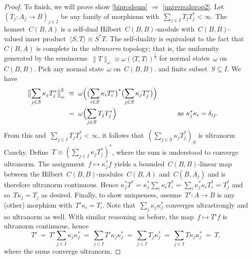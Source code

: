 \documentclass[reqno,T1]{amsproc}
\theoremstyle{plain}
\theoremstyle{remark}
\numberwithin{equation}{section}
\begin{document}
\begin{proof}
To finish, we will prove show \ref{biprodsum} $\Rightarrow$
        \ref{universalprop2}.
Let~$\left(T_j: A_j \to B\right)_{j\in I}$ be any family of morphisms
        with~$\sum_{j \in I}T_jT_j^* < \infty$.
The homset~$C(B,A)$
    is a self-dual Hilbert~$C(B,B)$-module
    with~$C(B,B)$-valued inner
    product~$\langle S, T\rangle \equiv S^*T$.\cite[2.15]{wstarcat}
The self-duality is equivalent to the fact
    that~$C(B,A)$ is complete in the \emph{ultranorm} topology;
    that is, the uniformity
    generated by the seminorms~$\| T \|_\omega \equiv \omega(\langle T,T\rangle)^\frac{1}{2}$
    for normal states~$\omega$ on~$C(B,B)$.\cite[\S149\textsubscript{V}]{bas}
    Pick any normal state~$\omega$ on~$C(B,B)$.
        and finite subset~$S \subseteq I$.  We have
\begin{alignat*}{2}
    \bigl\| \sum_{j \in S} \kappa_j T_j^* \bigr\|^2_\omega
    &\ \equiv \ 
    \omega\Bigl(\bigl(\sum_{i \in S} \kappa_i T_i^*\bigr)^*
            \bigl(\sum_{j \in S} \kappa_j T_j^*\bigr)\Bigr) \\
    &\ =\ 
    \omega\Bigl( \sum_{j \in S} T_j T_j^*
    \Bigr) &\qquad&\text{as~$\kappa_j^*\kappa_i = \delta_{ij}$}.
\end{alignat*}
From this and~$\sum_{j \in I} T_jT_j^* < \infty$,
    it follows that~$(\sum_{j \in S} \kappa_j T_j^*)_S$
    is ultranorm Cauchy.
    Define~$T \equiv ( \sum_{j \in I} \kappa_jT_j^* )^*$,
        where the sum is understood to converge ultranorm.
The assignment~$f \mapsto \kappa_j^*f$
    yields a bounded~$C(B,B)$-linear map between
    the Hilbert~$C(B,B)$-modules~$C(B,A)$ and~$C(B,A_j)$
    and is therefore ultranorm continuous.\cite[\S148]{bas}
    Hence
        $\kappa_j^* T^*
             =  \kappa_j^* \sum_{i} \kappa_i T_i^*
             =  \sum_i \kappa_{j }^*\kappa_i T_i^*
            =  T_j^*$
            and so~$T \kappa_j = T_j$ as desired.
Finally, to show uniqueness,
    assume~$T'\colon A \to B$ is any (other)
    morphism with~$T' \kappa_i = T_i$.
    Note that~$\sum_j \kappa_j \kappa_j^*$
       converges ultrastrongly
       and so ultranorm as well.
With similar reasoning as before,
        the map~$f \mapsto T' f$ is ultranorm continuous,
        hence
\begin{equation*}
    T'
    \ =\ T' \sum_{j \in I} \kappa_j \kappa_j^*
    \ =\ \sum_{j \in I} T' \kappa_j \kappa_j^*
    \ =\ \sum_{j \in I} T_j \kappa_j^*
    \ =\ \sum_{j \in I} T \kappa_j \kappa_j^*
    \ =\ T,
\end{equation*}
    where the sums converge ultranorm.
\end{proof}
\end{document}
